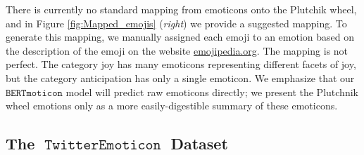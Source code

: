 \documentclass[11pt]{article}
\newcommand{\bertmoji}{\texttt{BERTmoticon}}
\DeclareMathOperator{\emoticon}{\texttt{TwitterEmoticon}}
\DeclareMathOperator{\corona}{\texttt{TwitterCorona}}
\begin{document}
There is currently no standard mapping from emoticons onto the Plutchik wheel,
and in Figure \ref{fig:Mapped_emojis} (\emph{right}) we provide a suggested mapping.
To generate this mapping, we manually assigned each emoji to an emotion based on the description of the emoji on the website \url{emojipedia.org}.
The mapping is not perfect.
The category joy has many emoticons representing different facets of joy,
but the category anticipation has only a single emoticon.
We emphasize that our $\bertmoji$ model will predict raw emoticons directly;
we present the Plutchnik wheel emotions only as a more easily-digestible summary of these emoticons.



\subsection{The $\emoticon$ Dataset}
\end{document}
